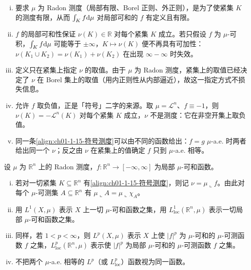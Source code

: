 \documentclass[../../main.tex]{subfiles}%
\begin{document}
\begin{remark}\label{remark:ch01-def-1-15-条件}
\begin{enumerate}[(i)]
\item 要求 $\mu$ 为 Radon 测度（局部有限、Borel 正则、外正则），是为了使紧集 $K$ 的测度有限，从而 $\int_{K}f\mathrm{d}\mu$ 对局部可和的 $f$ 有定义且有限。
\item $f$ 的局部可和性保证 $\nu(K)\in\mathbb{R}$ 对每个紧集 $K$ 成立。若只假设 $f$ 为 $\mu$-可积，$\int_{K}f\mathrm{d}\mu$ 可能等于 $\pm\infty$，$K\mapsto\nu(K)$ 便不再具有可加性：$\nu(K_1\cup K_2)=\nu(K_1)+\nu(K_2)$ 在出现 $\infty-\infty$ 时失效。
\item 定义只在紧集上指定 $\nu$ 的取值。由于 $\mu$ 为 Radon 测度，紧集上的取值已经决定了 $\nu$ 在 Borel 集上的取值（用内正则性从内部逼近），故这一指定方式不损失信息。
\item 允许 $f$ 取负值，正是「符号」二字的来源。取 $\mu=\mathcal{L}^n$、$f\equiv-1$，则 $\nu(K)=-\mathcal{L}^n(K)$ 对每个紧集 $K$ 成立，$\nu$ 不是测度：它在非空开集上取负值。
\item 同一条\eqref{align:ch01-1-15-符号测度}可以由不同的函数给出：$f=g$ $\mu$-a.e. 时两者给出同一个 $\nu$；反之由 $\nu$ 在紧集上的值确定 $f$ 只到 $\mu$-a.e. 相等。
\end{enumerate}
\end{remark}

\begin{definition*}[记号]\label{definition:ch01-1-3-记号}
设 $\mu$ 为 $\mathbb{R}^n$ 上的 Radon 测度，$f:\mathbb{R}^n\to[-\infty,\infty]$ 为局部 $\mu$-可和函数。
\begin{enumerate}[(i)]
\item 若对一切紧集 $K\subseteq\mathbb{R}^n$ 有\eqref{align:ch01-1-15-符号测度}，则记 $\nu=\mu\llcorner f$。由此对每个 $\mu$-可测集 $A\subseteq\mathbb{R}^n$ 有 $\mu\llcorner A=\mu\llcorner\chi_{A}$。
\item 用 $L^1(X,\mu)$ 表示 $X$ 上一切 $\mu$-可和函数之集，用 $L^1_{\mathrm{loc}}(\mathbb{R}^n,\mu)$ 表示一切局部 $\mu$-可和函数之集。
\item 同样，若 $1<p<\infty$，则 $L^p(X,\mu)$ 表示 $X$ 上使 $\lvert f\rvert^{p}$ 为 $\mu$-可和的 $\mu$-可测函数 $f$ 之集，$L^{p}_{\mathrm{loc}}(\mathbb{R}^n,\mu)$ 表示使 $\lvert f\rvert^{p}$ 为局部 $\mu$-可和的 $\mu$-可测函数 $f$ 之集。
\item 不把两个 $\mu$-a.e. 相等的 $L^p$（或 $L^{p}_{\mathrm{loc}}$）函数视为同一函数。
\end{enumerate}
\end{definition*}
\end{document}
